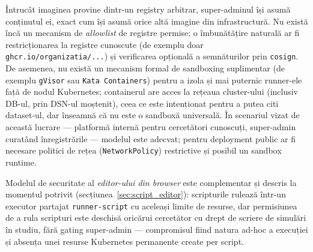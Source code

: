 Întrucât imaginea provine dintr-un registry arbitrar, super-adminul își asumă
conținutul ei, exact cum își asumă orice altă imagine din infrastructură.
Nu există încă un mecanism de \emph{allowlist} de registre permise; o
îmbunătățire naturală ar fi restricționarea la registre cunoscute (de exemplu
doar \texttt{ghcr.io/organizatia/...}) și verificarea opțională a semnăturilor
prin \texttt{cosign}. De asemenea, nu există un mecanism formal de sandboxing
suplimentar (de exemplu \texttt{gVisor} sau \texttt{Kata Containers}) pentru
a izola și mai puternic runner-ele față de nodul Kubernetes; containerul are
acces la rețeaua cluster-ului (inclusiv DB-ul, prin DSN-ul moștenit), ceea
ce este intenționat pentru a putea citi dataset-ul, dar înseamnă că nu este
o sandboxă universală. În scenariul vizat de această lucrare --- platformă
internă pentru cercetători cunoscuți, super-admin curatând înregistrările
--- modelul este adecvat; pentru deployment public ar fi necesare politici
de rețea (\texttt{NetworkPolicy}) restrictive și posibil un sandbox runtime.

Modelul de securitate al \emph{editor-ului din browser} este complementar și
descris la momentul potrivit (secțiunea~\ref{sec:script_editor}): scripturile
rulează într-un executor partajat \texttt{runner-script} cu aceleași limite
de resurse, dar permisiunea de a rula scripturi este deschisă oricărui
cercetător cu drept de scriere de simulări în studiu, fără gating
super-admin --- compromisul fiind natura ad-hoc a execuției și absența unei
resurse Kubernetes permanente create per script.
